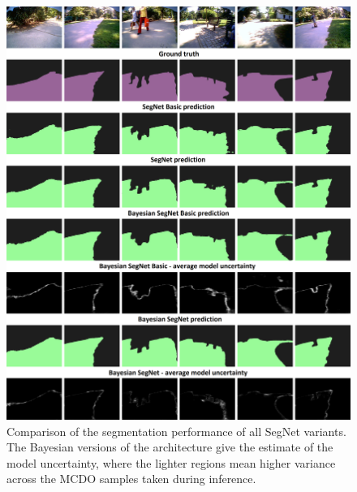 \begin{figure}[h]
	\begin{center}
		\includegraphics*[width=16cm, keepaspectratio]{obr/result.png}
	\end{center}
	\vspace{5mm}
	\caption{Comparison of the segmentation performance of all SegNet variants. The Bayesian versions of the architecture give the estimate of the model uncertainty, where the lighter regions mean higher variance across the MCDO samples taken during inference.} 
	\label{comparison}
\end{figure}
